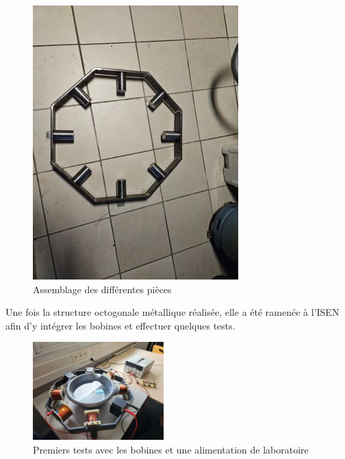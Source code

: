 \documentclass{article}
\begin{document}
\begin{figure}[H]
\begin{minipage}{0.3\textwidth}
    \end{minipage}
    \begin{minipage}{0.3\textwidth}
        \centering
        \includegraphics[width=\linewidth, angle=0]{Images/photoFabrications/octogone2.jpg}
        
    \end{minipage}
    \caption{Assemblage des différentes pièces}
    \label{fig:acier_ferailleur-3}
\end{figure}
\noindent
Une fois la structure octogonale métallique réalisée, elle a été ramenée à l'ISEN afin d'y intégrer les bobines et effectuer quelques tests.
    \begin{figure}[H]
    \centering
        \includegraphics[width = 0.45\textwidth]{Images/photoFabrications/test1.jpg}
        \caption{Premiers tests avec les bobines et une alimentation de laboratoire}
        \label{fig:test1}
    \end{figure}
\end{document}

